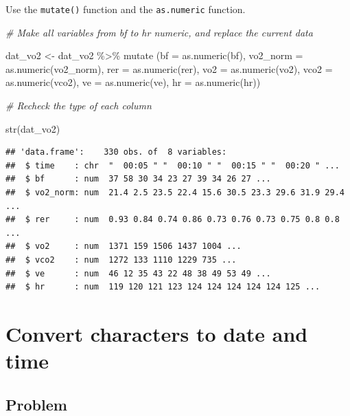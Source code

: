 \documentclass[
]{book}
\newenvironment{Shaded}{\begin{snugshade}}{\end{snugshade}}
\newcommand{\AttributeTok}[1]{\textcolor[rgb]{0.77,0.63,0.00}{#1}}
\newcommand{\CommentTok}[1]{\textcolor[rgb]{0.56,0.35,0.01}{\textit{#1}}}
\newcommand{\FunctionTok}[1]{\textcolor[rgb]{0.00,0.00,0.00}{#1}}
\newcommand{\NormalTok}[1]{#1}
\newcommand{\OtherTok}[1]{\textcolor[rgb]{0.56,0.35,0.01}{#1}}
\newcommand{\SpecialCharTok}[1]{\textcolor[rgb]{0.00,0.00,0.00}{#1}}
\begin{document}
Use the \texttt{mutate()} function and the \texttt{as.numeric} function.

\begin{Shaded}
\begin{Highlighting}[]
\CommentTok{\# Make all variables from bf to hr numeric, and replace the current data}

\NormalTok{dat\_vo2 }\OtherTok{\textless{}{-}}\NormalTok{  dat\_vo2 }\SpecialCharTok{\%\textgreater{}\%}
  \FunctionTok{mutate}\NormalTok{ (}\AttributeTok{bf =} \FunctionTok{as.numeric}\NormalTok{(bf),}
          \AttributeTok{vo2\_norm =} \FunctionTok{as.numeric}\NormalTok{(vo2\_norm),}
          \AttributeTok{rer =} \FunctionTok{as.numeric}\NormalTok{(rer),}
          \AttributeTok{vo2 =} \FunctionTok{as.numeric}\NormalTok{(vo2),}
          \AttributeTok{vco2 =} \FunctionTok{as.numeric}\NormalTok{(vco2),}
          \AttributeTok{ve =} \FunctionTok{as.numeric}\NormalTok{(ve),}
          \AttributeTok{hr =} \FunctionTok{as.numeric}\NormalTok{(hr))}

\CommentTok{\# Recheck the type of each column }

\FunctionTok{str}\NormalTok{(dat\_vo2)}
\end{Highlighting}
\end{Shaded}

\begin{verbatim}
## 'data.frame':    330 obs. of  8 variables:
##  $ time    : chr  "  00:05 " "  00:10 " "  00:15 " "  00:20 " ...
##  $ bf      : num  37 58 30 34 23 27 39 34 26 27 ...
##  $ vo2_norm: num  21.4 2.5 23.5 22.4 15.6 30.5 23.3 29.6 31.9 29.4 ...
##  $ rer     : num  0.93 0.84 0.74 0.86 0.73 0.76 0.73 0.75 0.8 0.8 ...
##  $ vo2     : num  1371 159 1506 1437 1004 ...
##  $ vco2    : num  1272 133 1110 1229 735 ...
##  $ ve      : num  46 12 35 43 22 48 38 49 53 49 ...
##  $ hr      : num  119 120 121 123 124 124 124 124 124 125 ...
\end{verbatim}

\hypertarget{WRANGLE-CHARACTER-2-TIME}{%
\section{Convert characters to date and time}\label{WRANGLE-CHARACTER-2-TIME}}

\hypertarget{problem-3}{%
\subsection{Problem}\label{problem-3}}
\end{document}
